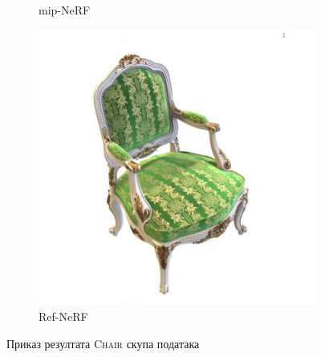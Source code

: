 \documentclass[12pt, a4paper, twoside]{book}
\numberwithin{equation}{chapter}
\numberwithin{theorem}{section}
\numberwithin{definition}{section}
\numberwithin{definitionChapter}{chapter}
\begin{document}
\begin{figure}[H]
\begin{subfigure}{0.3\textwidth}
			\caption{mip-NeRF}
		\end{subfigure}
		\begin{subfigure}{0.3\textwidth}
			\centering
			\includegraphics[scale=0.2]{img/refnerf/refnerf_chair_38.jpg}
			\caption{Ref-NeRF}
		\end{subfigure}
		\caption{Приказ резултата \textsc{Chair} скупа података}
		\label{fig-chair-results}
	\end{figure}
\end{document}

